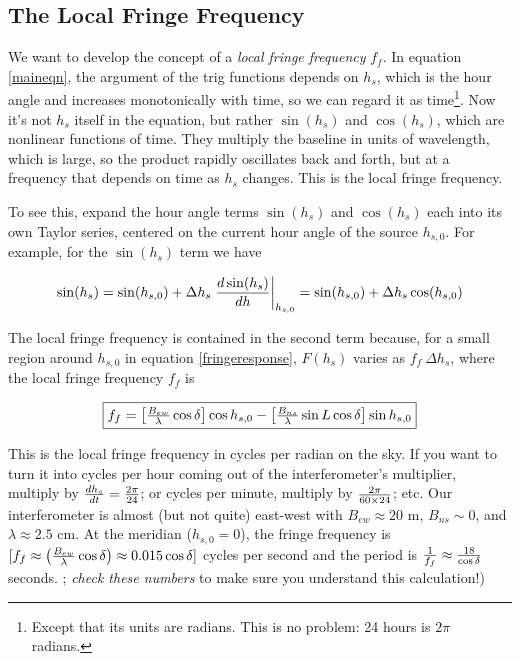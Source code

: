 \documentclass[11pt,preprint]{aastex}
\begin{document}
\subsection{The Local Fringe Frequency}
We want to develop the concept of a {\it local fringe frequency}
$f_f$. In equation \ref{maineqn}, the argument of the trig functions
depends on $h_s$, which is the hour angle and increases monotonically
with time, so we can regard it as time\footnote{Except that its units
  are radians. This is no problem: 24 hours is $2\pi$ radians.}. Now
it's not $h_s$ itself in the equation, but rather $\sin( h_s)$ and
$\cos(h_s)$, which are nonlinear functions of time. They multiply the
baseline in units of wavelength, which is large, so the product rapidly
oscillates back and forth, but at a frequency that depends on time as
$h_s$ changes.  This is the local fringe frequency.

To see this, expand the hour angle terms $\sin (h_s)$ and $\cos (h_s)$
each into its own Taylor series, centered on the current hour angle of the
source $h_{s,0}$. For example, for the $\sin(h_s)$ term we have

\begin{equation} \label{taylorexpansion}
\sin (h_s) = \sin( h_{s,0}) + 
  \Delta h_s \left. {d \sin(h_s) \over dh}\right|_{h_{s,0}} = 
\sin( h_{s,0}) + \Delta h_s \cos( h_{s,0}) 
\end{equation}

\noindent The local fringe frequency is contained in the second term
because, for a small region around $h_{s,0}$ in equation
\ref{fringeresponse}, $F(h_s)$ varies as $f_f \ \Delta h_s$, where  the
local fringe frequency $f_f$ is

\begin{equation} \label{fringefreq} \fbox{$
f_f = \left[{B_{ew} \over \lambda} \cos \delta \right] \cos h_{s,0} 
- \left[{B_{ns} \over \lambda} \sin L \cos \delta \right] \sin h_{s,0}
$}
\end{equation}

\noindent This is the local fringe frequency in cycles per radian on the
sky. If you want to turn it into cycles per hour coming out of the
interferometer's multiplier, multiply by ${dh_s \over dt} = {2\pi \over
  24}$; or cycles per minute, multiply by $2\pi \over 60 \times 24$;
etc. Our interferometer is almost (but not quite) east-west
with $B_{ew}\approx 20$ m, $B_{ns} \sim 0$, and $\lambda \approx 2.5$
cm. At the meridian ($h_{s,0}=0$), the fringe frequency is $[f_f \approx
  \left({B_{ew} \over \lambda} \cos{\delta} \right) \approx 0.015 \cos
  \delta]$ cycles per second and the period is ${1 \over f_f} \approx
{18 \over \cos \delta}$ seconds. ; {\it check these numbers} to make sure you understand this
calculation!)
\end{document}
